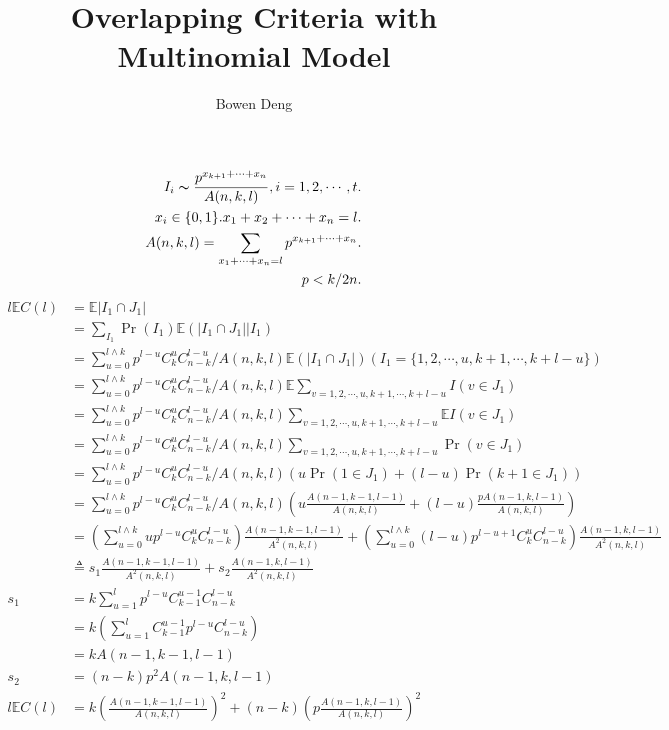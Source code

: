 \documentclass{article}
\title{Overlapping Criteria with Multinomial Model}
\author{Bowen Deng}
\date{}
\begin{document}
\maketitle
\begin{eqnarray}
I_i\thicksim \frac{p^{x_{k+1}+\cdots+x_n}}{A(n,k,l)}, i=1,2,\cdots,t.\\
x_i\in\{0,1\}. x_1+x_2+\cdots+x_n=l.\\
A(n,k,l)=\sum_{x_1+\cdots+x_n=l}p^{x_{k+1}+\cdots+x_n}.\\
p<k/2n.
\end{eqnarray}
\begin{displaymath}
\begin{split}
l\mathbb{E}C(l)&=\mathbb{E}|I_1\cap J_1|\\
&=\sum_{I_1}\Pr(I_1)\mathbb{E}(|I_1\cap J_1|\big| I_1)\\
&=\sum_{u=0}^{l\wedge k} p^{l-u}C_k^uC_{n-k}^{l-u}/A(n,k,l)\mathbb{E}(|I_1\cap J_1|) (I_1=\{1,2,\cdots,u,k+1,\cdots,k+l-u\})\\
&=\sum_{u=0}^{l\wedge k} p^{l-u}C_k^uC_{n-k}^{l-u}/A(n,k,l)\mathbb{E}\sum_{v=1,2,\cdots,u,k+1,\cdots,k+l-u}I(v\in J_1)\\
&=\sum_{u=0}^{l\wedge k} p^{l-u}C_k^uC_{n-k}^{l-u}/A(n,k,l)\sum_{v=1,2,\cdots,u,k+1,\cdots,k+l-u}\mathbb{E}I(v\in J_1)\\
&=\sum_{u=0}^{l\wedge k} p^{l-u}C_k^uC_{n-k}^{l-u}/A(n,k,l)\sum_{v=1,2,\cdots,u,k+1,\cdots,k+l-u}\Pr(v\in J_1)\\
&=\sum_{u=0}^{l\wedge k} p^{l-u}C_k^uC_{n-k}^{l-u}/A(n,k,l)(u\Pr(1\in J_1)+(l-u)\Pr(k+1\in J_1))\\
&=\sum_{u=0}^{l\wedge k} p^{l-u}C_k^uC_{n-k}^{l-u}/A(n,k,l)(u\frac{A(n-1,k-1,l-1)}{A(n,k,l)}+(l-u)\frac{pA(n-1,k,l-1)}{A(n,k,l)})\\
&=(\sum_{u=0}^{l\wedge k} up^{l-u}C_k^uC_{n-k}^{l-u})\frac{A(n-1,k-1,l-1)}{A^2(n,k,l)}+(\sum_{u=0}^{l\wedge k} (l-u)p^{l-u+1}C_k^uC_{n-k}^{l-u})\frac{A(n-1,k,l-1)}{A^2(n,k,l)}\\
&\triangleq s_1\frac{A(n-1,k-1,l-1)}{A^2(n,k,l)}+s_2\frac{A(n-1,k,l-1)}{A^2(n,k,l)}\\
s_1&=k\sum_{u=1}^l p^{l-u}C_{k-1}^{u-1}C_{n-k}^{l-u}\\
&=k(\sum_{u=1}^l C_{k-1}^{u-1}p^{l-u}C_{n-k}^{l-u})\\
&=kA(n-1,k-1,l-1)\\
s_2&=(n-k)p^2A(n-1,k,l-1)\\
l\mathbb{E}C(l)&=k(\frac{A(n-1,k-1,l-1)}{A(n,k,l)})^2+(n-k)(p\frac{A(n-1,k,l-1)}{A(n,k,l)})^2\\
\end{split}
\end{displaymath}
\end{document}
